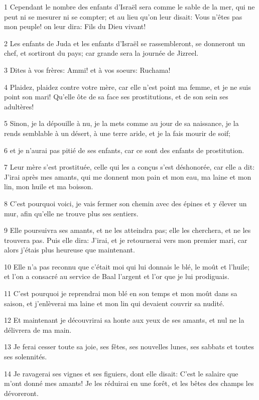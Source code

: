 \par 1 Cependant le nombre des enfants d'Israël sera comme le sable de la mer, qui ne peut ni se mesurer ni se compter; et au lieu qu'on leur disait: Vous n'êtes pas mon peuple! on leur dira: Fils du Dieu vivant!
\par 2 Les enfants de Juda et les enfants d'Israël se rassembleront, se donneront un chef, et sortiront du pays; car grande sera la journée de Jizreel.
\par 3 Dites à vos frères: Ammi! et à vos soeurs: Ruchama!
\par 4 Plaidez, plaidez contre votre mère, car elle n'est point ma femme, et je ne suis point son mari! Qu'elle ôte de sa face ses prostitutions, et de son sein ses adultères!
\par 5 Sinon, je la dépouille à nu, je la mets comme au jour de sa naissance, je la rends semblable à un désert, à une terre aride, et je la fais mourir de soif;
\par 6 et je n'aurai pas pitié de ses enfants, car ce sont des enfants de prostitution.
\par 7 Leur mère s'est prostituée, celle qui les a conçus s'est déshonorée, car elle a dit: J'irai après mes amants, qui me donnent mon pain et mon eau, ma laine et mon lin, mon huile et ma boisson.
\par 8 C'est pourquoi voici, je vais fermer son chemin avec des épines et y élever un mur, afin qu'elle ne trouve plus ses sentiers.
\par 9 Elle poursuivra ses amants, et ne les atteindra pas; elle les cherchera, et ne les trouvera pas. Puis elle dira: J'irai, et je retournerai vers mon premier mari, car alors j'étais plus heureuse que maintenant.
\par 10 Elle n'a pas reconnu que c'était moi qui lui donnais le blé, le moût et l'huile; et l'on a consacré au service de Baal l'argent et l'or que je lui prodiguais.
\par 11 C'est pourquoi je reprendrai mon blé en son temps et mon moût dans sa saison, et j'enlèverai ma laine et mon lin qui devaient couvrir sa nudité.
\par 12 Et maintenant je découvrirai sa honte aux yeux de ses amants, et nul ne la délivrera de ma main.
\par 13 Je ferai cesser toute sa joie, ses fêtes, ses nouvelles lunes, ses sabbats et toutes ses solennités.
\par 14 Je ravagerai ses vignes et ses figuiers, dont elle disait: C'est le salaire que m'ont donné mes amants! Je les réduirai en une forêt, et les bêtes des champs les dévoreront.

